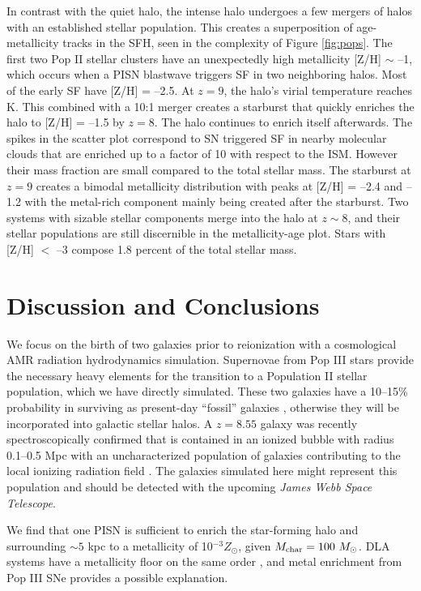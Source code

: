 \documentclass{PoS}
\begin{document}
In contrast with the quiet halo, the intense halo undergoes a few
mergers of halos with an established stellar population.  This creates
a superposition of age-metallicity tracks in the SFH, seen in the
complexity of Figure \ref{fig:pops}.  The first two Pop II stellar
clusters have an unexpectedly high metallicity [Z/H] $\sim$ --1, which
occurs when a PISN blastwave triggers SF in two neighboring halos.
Most of the early SF have [Z/H] = --2.5.  At $z=9$, the halo's virial
temperature reaches  K.  This combined with a 10:1 merger
creates a starburst that quickly enriches the halo to [Z/H] = --1.5 by
$z=8$.  The halo continues to enrich itself afterwards.  The spikes in
the scatter plot correspond to SN triggered SF in nearby molecular
clouds that are enriched up to a factor of 10 with respect to the ISM.
However their mass fraction are small compared to the total stellar
mass.  The starburst at $z=9$ creates a bimodal metallicity
distribution with peaks at [Z/H] = --2.4 and --1.2 with the metal-rich
component mainly being created after the starburst.  Two systems with
sizable stellar components merge into the halo at $z \sim 8$, and
their stellar populations are still discernible in the metallicity-age
plot.  Stars with [Z/H] $<$ --3 compose 1.8 percent of the total
stellar mass.

\section{Discussion and Conclusions}

We focus on the birth of two galaxies prior to reionization with a
cosmological AMR radiation hydrodynamics simulation.  Supernovae from
Pop III stars provide the necessary heavy elements for the transition
to a Population II stellar population, which we have directly
simulated.  These two galaxies have a 10--15\% probability in
surviving as present-day ``fossil'' galaxies \citep{Gnedin06},
otherwise they will be incorporated into galactic stellar halos.  A
$z=8.55$ galaxy was recently spectroscopically confirmed that is
contained in an ionized bubble with radius 0.1--0.5 Mpc with an
uncharacterized population of galaxies contributing to the local
ionizing radiation field \citep{Lehnert10_z8.6}.  The galaxies
simulated here might represent this population and should be detected
with the upcoming \textit{James Webb Space Telescope}.

We find that one PISN is sufficient to enrich the star-forming halo
and surrounding $\sim 5$ kpc to a metallicity of 10$^{-3} Z_\odot$,
given $M_{\rm char} = 100~\Ms$.  DLA systems have a metallicity floor
on the same order \citep{Wolfe05_Review}, and metal enrichment from Pop
III SNe provides a possible explanation.
\end{document}
